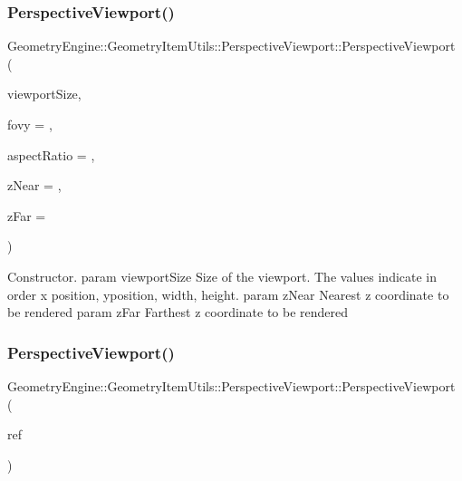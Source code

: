 \subsubsection{\texorpdfstring{PerspectiveViewport()}{PerspectiveViewport()}\hspace{0.1cm}{\footnotesize\ttfamily [1/2]}}
{\footnotesize\ttfamily Geometry\+Engine\+::\+Geometry\+Item\+Utils\+::\+Perspective\+Viewport\+::\+Perspective\+Viewport (\begin{DoxyParamCaption}\item[{const Q\+Vector4D \&}]{viewport\+Size,  }\item[{G\+Ldouble}]{fovy = {},  }\item[{G\+Ldouble}]{aspect\+Ratio = {},  }\item[{G\+Ldouble}]{z\+Near = {},  }\item[{G\+Ldouble}]{z\+Far = {} }\end{DoxyParamCaption})}

Constructor. param viewport\+Size Size of the viewport. The values indicate in order x position, yposition, width, height. param z\+Near Nearest z coordinate to be rendered param z\+Far Farthest z coordinate to be rendered \mbox{\label{class_geometry_engine_1_1_geometry_item_utils_1_1_perspective_viewport_a9d671fa5666d470b23369b11e4dbc298}} 
\subsubsection{\texorpdfstring{PerspectiveViewport()}{PerspectiveViewport()}\hspace{0.1cm}{\footnotesize\ttfamily [2/2]}}
{\footnotesize\ttfamily Geometry\+Engine\+::\+Geometry\+Item\+Utils\+::\+Perspective\+Viewport\+::\+Perspective\+Viewport (\begin{DoxyParamCaption}\item[{const \mbox{\hyperlink{class_geometry_engine_1_1_geometry_item_utils_1_1_perspective_viewport}{Perspective\+Viewport}} \&}]{ref }\end{DoxyParamCaption})}

